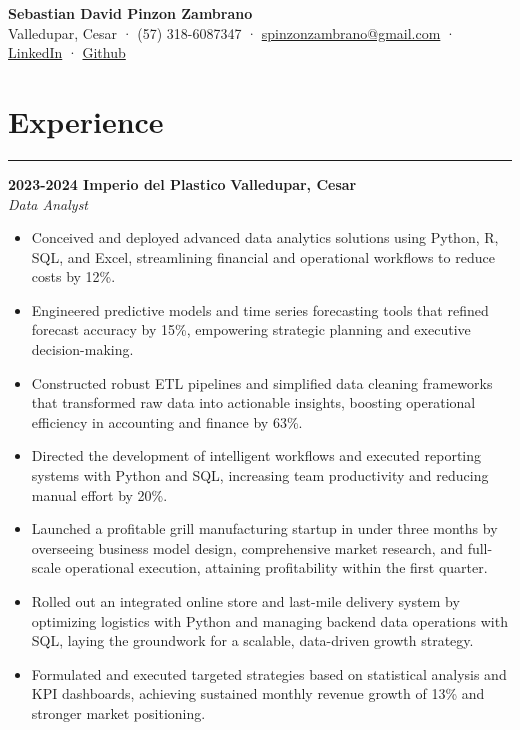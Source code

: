 \documentclass[9pt,a4paper]{article}
\newcommand{\cvevent}[4]{%
  {\noindent \textbf{#1 #2} \hfill \textbf{#3}\\%
   \textit{#4}\\[0pt]}%
}
\begin{document}
\begin{center}
    \textbf{\LARGE Sebastian David Pinzon Zambrano} \\
    Valledupar, Cesar · (57) 318-6087347 · \href{mailto:spinzonzambrano@gmail.com}{spinzonzambrano@gmail.com} ·
    \href{https://www.linkedin.com/in/sebastiandpinzon/?locale=en_US}{LinkedIn} · \href{https://github.com/Ares-Infenus}{Github}
\end{center}
\vspace{-1em}

\section*{Experience}
\vspace{-\baselineskip}
\noindent\rule{\linewidth}{0.5pt}

\cvevent{2023-2024}{Imperio del Plastico}{Valledupar, Cesar}{Data Analyst}
\vspace{-\baselineskip}
\begin{itemize}[noitemsep, topsep=0pt]
    \item Conceived and deployed advanced data analytics solutions using Python, R, SQL, and Excel, streamlining financial and operational workflows to reduce costs by 12\%.
    \item Engineered predictive models and time series forecasting tools that refined forecast accuracy by 15\%, empowering strategic planning and executive decision-making.
    \item Constructed robust ETL pipelines and simplified data cleaning frameworks that transformed raw data into actionable insights, boosting operational efficiency in accounting and finance by 63\%.
    \item Directed the development of intelligent workflows and executed reporting systems with Python and SQL, increasing team productivity and reducing manual effort by 20\%.
    \item Launched a profitable grill manufacturing startup in under three months by overseeing business model design, comprehensive market research, and full-scale operational execution, attaining profitability within the first quarter.
    \item Rolled out an integrated online store and last-mile delivery system by optimizing logistics with Python and managing backend data operations with SQL, laying the groundwork for a scalable, data-driven growth strategy.
    \item Formulated and executed targeted strategies based on statistical analysis and KPI dashboards, achieving sustained monthly revenue growth of 13\% and stronger market positioning.
\end{itemize}
\end{document}
